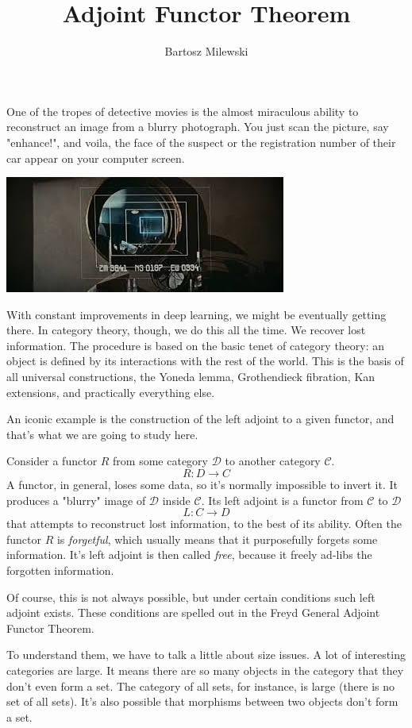 \documentclass[11pt]{amsart}
\author{Bartosz Milewski}
\title{Adjoint Functor Theorem}
\newcommand{\cat}[1]{\mathcal{#1}}
\begin{document}
\maketitle{}

One of the tropes of detective movies is the almost miraculous ability to reconstruct an image from a blurry photograph. You just scan the picture,  say "enhance!", and voila, the face of the suspect or the registration number of their car appear on your computer screen. 

\includegraphics{BladeRunner.jpeg}

With constant improvements in deep learning, we might be eventually getting there. In category theory, though, we do this all the time. We recover lost information. The procedure is based on the basic tenet of category theory: an object is defined by its interactions with the rest of the world. This is the basis of all universal constructions, the Yoneda lemma, Grothendieck fibration, Kan extensions, and practically everything else. 

An iconic example is the construction of the left adjoint to a given functor, and that's what we are going to study here. 

Consider a functor $R$ from some category $\cat D$ to another category $\cat C$. 
\[R \colon D \to C \]
A functor, in general, loses some data, so it's normally impossible to invert it. It produces a "blurry" image of $\cat D$ inside $\cat C$. Its left adjoint is a functor from $\cat C$ to $\cat D$ 
\[ L \colon C \to D\]
that attempts to reconstruct lost information, to the best of its ability. Often the functor $R$ is \emph{forgetful}, which usually means that it purposefully forgets some information. It's left adjoint is then called \emph{free}, because it freely ad-libs the forgotten information. 


Of course, this is not always possible, but under certain conditions such left adjoint exists. These conditions are spelled out in the Freyd General Adjoint Functor Theorem. 

To understand them, we have to talk a little about size issues. A lot of interesting categories are large. It means there are so many objects in the category that they don't even form a set. The category of all sets, for instance, is large (there is no set of all sets). It's also possible that morphisms between two objects don't form a set. 
\end{document}

